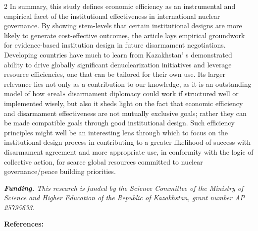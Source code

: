 \begin{multicols}{2}
In summary, this study defines economic efficiency as an instrumental
and empirical facet of the institutional effectiveness in international
nuclear governance. By showing stem-levels that certain institutional
designs are more likely to generate cost-effective outcomes, the article
lays empirical groundwork for evidence-based institution design in
future disarmament negotiations. Developing countries have much to learn
from Kazakhstan' s demonstrated ability to drive globally
significant denuclearization initiatives and leverage resource
efficiencies, one that can be tailored for their own use. Its larger
relevance lies not only as a contribution to our knowledge, as it is an
outstanding model of how «real» disarmament diplomacy could work if
structured well or implemented wisely, but also it sheds light on the
fact that economic efficiency and disarmament effectiveness are not
mutually exclusive goals; rather they can be made compatible goals
through good institutional design. Such efficiency principles might well
be an interesting lens through which to focus on the institutional
design process in contributing to a greater likelihood of success with
disarmament agreement and more appropriate use, in conformity with the
logic of collective action, for scarce global resources committed to
nuclear governance/peace building priorities.

\emph{{\bfseries Funding.} This research is funded by the Science Committee
of the Ministry of Science and Higher Education of the Republic of
Kazakhstan, grant number AP 25795633.}
\end{multicols}

\begin{center}
{\bfseries References:}
\end{center}

